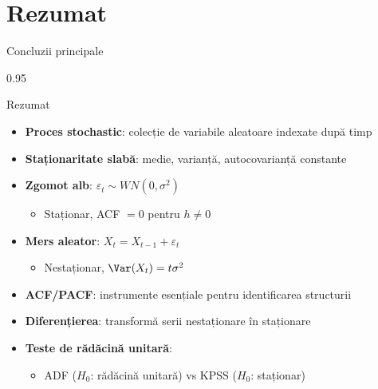 \documentclass[9pt, aspectratio=169, t]{beamer}
\begin{document}
\section{Rezumat}

\begin{frame}{Concluzii principale}
    \begin{cminipage}{0.95\textwidth}
        \begin{block}{Rezumat}
            \small
            \begin{itemize}\setlength{\itemsep}{0pt}
                \item \textbf{Proces stochastic}: colecție de variabile aleatoare indexate după timp
                \item \textbf{Staționaritate slabă}: medie, varianță, autocovarianță constante
                \item \textbf{Zgomot alb}: $\varepsilon_t \sim WN(0, \sigma^2)$
                \begin{itemize}
                    \item Staționar, ACF $= 0$ pentru $h \neq 0$
                \end{itemize}
                \item \textbf{Mers aleator}: $X_t = X_{t-1} + \varepsilon_t$
                \begin{itemize}
                    \item Nestaționar, $\Var(X_t) = t\sigma^2$
                \end{itemize}
                \item \textbf{ACF/PACF}: instrumente esențiale pentru identificarea structurii
                \item \textbf{Diferențierea}: transformă serii nestaționare în staționare
                \item \textbf{Teste de rădăcină unitară}:
                \begin{itemize}
                    \item ADF ($H_0$: rădăcină unitară) vs KPSS ($H_0$: staționar)
                \end{itemize}
            \end{itemize}
        \end{block}
    \end{cminipage}
\end{frame}
\end{document}
